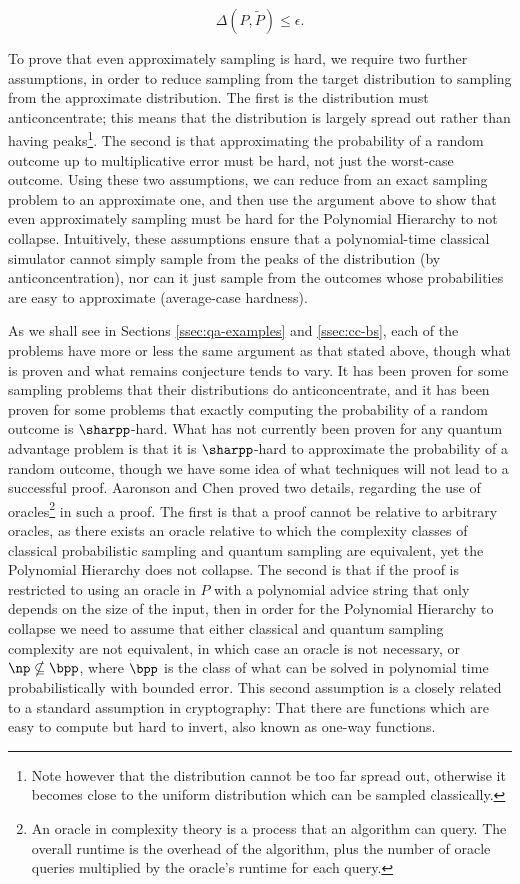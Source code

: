 \begin{equation}
\Delta(P, \tilde{P}) \leq \epsilon.
\end{equation}

To prove that even approximately sampling is hard, we require two further assumptions, in order to reduce sampling from the target distribution to sampling from the approximate distribution. The first is the distribution must anticoncentrate; this means that the distribution is largely spread out rather than having peaks\footnote{Note however that the distribution cannot be too far spread out, otherwise it becomes close to the uniform distribution which can be sampled classically.}. The second is that approximating the probability of a random outcome up to multiplicative error must be hard, not just the worst-case outcome. Using these two assumptions, we can reduce from an exact sampling problem to an approximate one, and then use the argument above to show that even approximately sampling must be hard for the Polynomial Hierarchy to not collapse. Intuitively, these assumptions ensure that a polynomial-time classical simulator cannot simply sample from the peaks of the distribution (by anticoncentration), nor can it just sample from the outcomes whose probabilities are easy to approximate (average-case hardness).

As we shall see in Sections \ref{ssec:qa-examples} and \ref{ssec:cc-bs}, each of the problems have more or less the same argument as that stated above, though what is proven and what remains conjecture tends to vary. It has been proven for some sampling problems that their distributions do anticoncentrate, and it has been proven for some problems that exactly computing the probability of a random outcome is $\sharpp$-hard. What has not currently been proven for any quantum advantage problem is that it is $\sharpp$-hard to approximate the probability of a random outcome, though we have some idea of what techniques will not lead to a successful proof. Aaronson and Chen \cite{aaronson2016chen} proved two details, regarding the use of oracles\footnote{An oracle in complexity theory is a process that an algorithm can query. The overall runtime is the overhead of the algorithm, plus the number of oracle queries multiplied by the oracle's runtime for each query.} in such a proof. The first is that a proof cannot be relative to arbitrary oracles, as there exists an oracle relative to which the complexity classes of classical probabilistic sampling and quantum sampling are equivalent, yet the Polynomial Hierarchy does not collapse. The second is that if the proof is restricted to using an oracle in $P$ with a polynomial advice string that only depends on the size of the input, then in order for the Polynomial Hierarchy to collapse we need to assume that either classical and quantum sampling complexity are not equivalent, in which case an oracle is not necessary, or $\np \nsubseteq \bpp$, where $\bpp$ is the class of what can be solved in polynomial time probabilistically with bounded error. This second assumption is a closely related to a standard assumption in cryptography: That there are functions which are easy to compute but hard to invert, also known as one-way functions.

